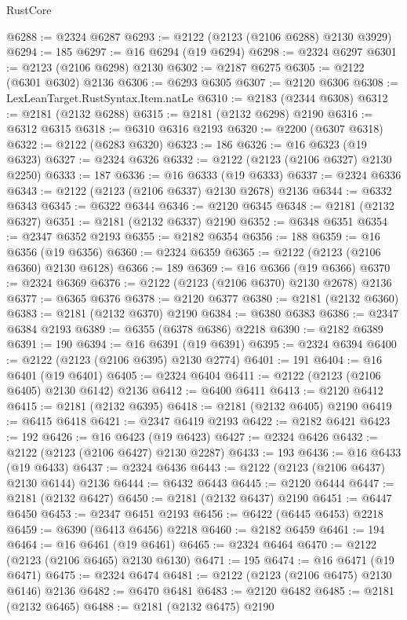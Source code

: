 \begin{lexlean}{RustCore}
\begin{coremodule}
@6288 := @2324 @6287
@6293 := @2122 (@2123 (@2106 @6288) @2130 @3929)
@6294 := 185
@6297 := @16 @6294 (@19 @6294)
@6298 := @2324 @6297
@6301 := @2123 (@2106 @6298) @2130
@6302 := @2187 @6275
@6305 := @2122 (@6301 @6302) @2136
@6306 := @6293 @6305
@6307 := @2120 @6306
@6308 := LexLeanTarget.RustSyntax.Item.natLe
@6310 := @2183 (@2344 @6308)
@6312 := @2181 (@2132 @6288)
@6315 := @2181 (@2132 @6298) @2190
@6316 := @6312 @6315
@6318 := @6310 @6316 @2193
@6320 := @2200 (@6307 @6318)
@6322 := @2122 (@6283 @6320)
@6323 := 186
@6326 := @16 @6323 (@19 @6323)
@6327 := @2324 @6326
@6332 := @2122 (@2123 (@2106 @6327) @2130 @2250)
@6333 := 187
@6336 := @16 @6333 (@19 @6333)
@6337 := @2324 @6336
@6343 := @2122 (@2123 (@2106 @6337) @2130 @2678) @2136
@6344 := @6332 @6343
@6345 := @6322 @6344
@6346 := @2120 @6345
@6348 := @2181 (@2132 @6327)
@6351 := @2181 (@2132 @6337) @2190
@6352 := @6348 @6351
@6354 := @2347 @6352 @2193
@6355 := @2182 @6354
@6356 := 188
@6359 := @16 @6356 (@19 @6356)
@6360 := @2324 @6359
@6365 := @2122 (@2123 (@2106 @6360) @2130 @6128)
@6366 := 189
@6369 := @16 @6366 (@19 @6366)
@6370 := @2324 @6369
@6376 := @2122 (@2123 (@2106 @6370) @2130 @2678) @2136
@6377 := @6365 @6376
@6378 := @2120 @6377
@6380 := @2181 (@2132 @6360)
@6383 := @2181 (@2132 @6370) @2190
@6384 := @6380 @6383
@6386 := @2347 @6384 @2193
@6389 := @6355 (@6378 @6386) @2218
@6390 := @2182 @6389
@6391 := 190
@6394 := @16 @6391 (@19 @6391)
@6395 := @2324 @6394
@6400 := @2122 (@2123 (@2106 @6395) @2130 @2774)
@6401 := 191
@6404 := @16 @6401 (@19 @6401)
@6405 := @2324 @6404
@6411 := @2122 (@2123 (@2106 @6405) @2130 @6142) @2136
@6412 := @6400 @6411
@6413 := @2120 @6412
@6415 := @2181 (@2132 @6395)
@6418 := @2181 (@2132 @6405) @2190
@6419 := @6415 @6418
@6421 := @2347 @6419 @2193
@6422 := @2182 @6421
@6423 := 192
@6426 := @16 @6423 (@19 @6423)
@6427 := @2324 @6426
@6432 := @2122 (@2123 (@2106 @6427) @2130 @2287)
@6433 := 193
@6436 := @16 @6433 (@19 @6433)
@6437 := @2324 @6436
@6443 := @2122 (@2123 (@2106 @6437) @2130 @6144) @2136
@6444 := @6432 @6443
@6445 := @2120 @6444
@6447 := @2181 (@2132 @6427)
@6450 := @2181 (@2132 @6437) @2190
@6451 := @6447 @6450
@6453 := @2347 @6451 @2193
@6456 := @6422 (@6445 @6453) @2218
@6459 := @6390 (@6413 @6456) @2218
@6460 := @2182 @6459
@6461 := 194
@6464 := @16 @6461 (@19 @6461)
@6465 := @2324 @6464
@6470 := @2122 (@2123 (@2106 @6465) @2130 @6130)
@6471 := 195
@6474 := @16 @6471 (@19 @6471)
@6475 := @2324 @6474
@6481 := @2122 (@2123 (@2106 @6475) @2130 @6146) @2136
@6482 := @6470 @6481
@6483 := @2120 @6482
@6485 := @2181 (@2132 @6465)
@6488 := @2181 (@2132 @6475) @2190

\end{coremodule}
\end{lexlean}
